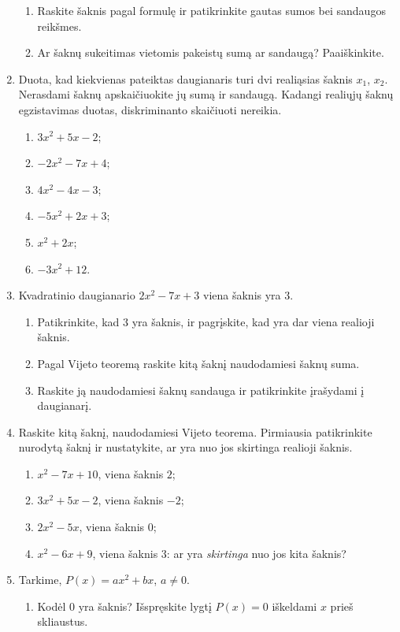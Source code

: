 \documentclass[12pt,a4paper]{article}
\begin{document}
\begin{enumerate}[series=uzdaviniai]
\begin{enumerate}
\item Raskite šaknis pagal formulę ir patikrinkite gautas sumos bei sandaugos reikšmes.
\item Ar šaknų sukeitimas vietomis pakeistų sumą ar sandaugą? Paaiškinkite.
\end{enumerate}
\item Duota, kad kiekvienas pateiktas daugianaris turi dvi realiąsias šaknis $x_1$, $x_2$. Nerasdami šaknų apskaičiuokite jų sumą ir sandaugą. Kadangi realiųjų šaknų egzistavimas duotas, diskriminanto skaičiuoti nereikia.
\begin{multicols}{2}\begin{enumerate}
\item $3x^2+5x-2$; \item $-2x^2-7x+4$; \item $4x^2-4x-3$; \item $-5x^2+2x+3$; \item $x^2+2x$; \item $-3x^2+12$.
\end{enumerate}\end{multicols}
\item Kvadratinio daugianario $2x^2-7x+3$ viena šaknis yra $3$.
\begin{enumerate}
\item Patikrinkite, kad $3$ yra šaknis, ir pagrįskite, kad yra dar viena realioji šaknis.
\item Pagal Vijeto teoremą raskite kitą šaknį naudodamiesi šaknų suma.
\item Raskite ją naudodamiesi šaknų sandauga ir patikrinkite įrašydami į daugianarį.
\end{enumerate}
\item Raskite kitą šaknį, naudodamiesi Vijeto teorema. Pirmiausia patikrinkite nurodytą šaknį ir nustatykite, ar yra nuo jos skirtinga realioji šaknis.
\begin{enumerate}
\item $x^2-7x+10$, viena šaknis $2$; \item $3x^2+5x-2$, viena šaknis $-2$; \item $2x^2-5x$, viena šaknis $0$; \item $x^2-6x+9$, viena šaknis $3$: ar yra \emph{skirtinga} nuo jos kita šaknis?
\end{enumerate}
\item Tarkime, $P(x)=ax^2+bx$, $a\ne0$.
\begin{enumerate}
\item Kodėl $0$ yra šaknis? Išspręskite lygtį $P(x)=0$ iškeldami $x$ prieš skliaustus.

\end{enumerate}
\end{enumerate}
\end{document}
